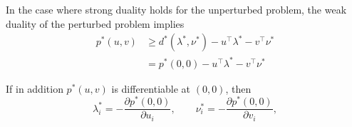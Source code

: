 
In the case where strong duality holds for the unperturbed problem, the weak duality of the perturbed problem implies
\begin{align*}
    p^*(u,v) & \geq d^*(\lambda^*,\nu^*) - u^\top \lambda^* -v^\top\nu^* \\
             & = p^*(0,0) - u^\top \lambda^* -v^\top\nu^*
\end{align*}

\newpar{}

If in addition $p^*(u,v)$ is differentiable at $(0,0)$, then
\begin{equation*}
    \lambda_i^* = -\frac{\partial p^*(0,0)}{\partial u_i}, \qquad  \nu_i^* = -\frac{\partial p^*(0,0)}{\partial v_i},
\end{equation*}